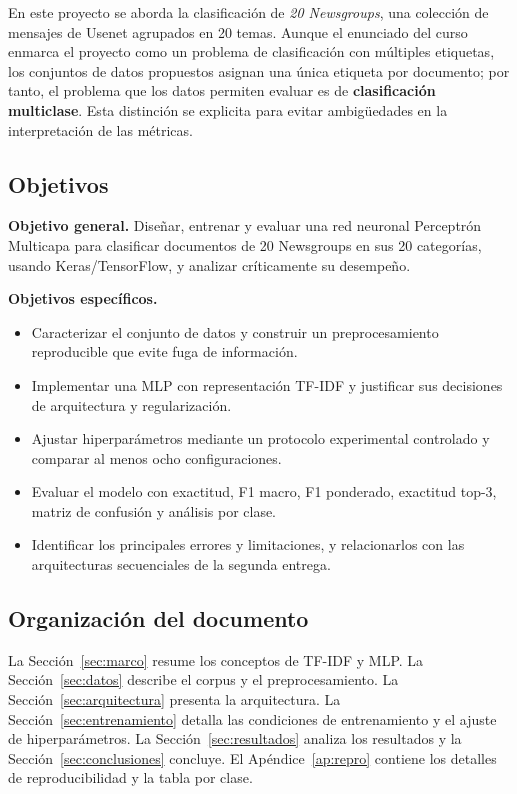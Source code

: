 \documentclass[11pt,letterpaper]{article}
\begin{document}
En este proyecto se aborda la clasificación de \textit{20 Newsgroups}, una colección de mensajes de Usenet agrupados en 20 temas. Aunque el enunciado del curso enmarca el proyecto como un problema de clasificación con múltiples etiquetas, los conjuntos de datos propuestos asignan una única etiqueta por documento; por tanto, el problema que los datos permiten evaluar es de \textbf{clasificación multiclase}. Esta distinción se explicita para evitar ambigüedades en la interpretación de las métricas.

\subsection*{Objetivos}

\textbf{Objetivo general.} Diseñar, entrenar y evaluar una red neuronal Perceptrón Multicapa para clasificar documentos de 20 Newsgroups en sus 20 categorías, usando Keras/TensorFlow, y analizar críticamente su desempeño.

\textbf{Objetivos específicos.}
\begin{itemize}[leftmargin=1.2em]
  \item Caracterizar el conjunto de datos y construir un preprocesamiento reproducible que evite fuga de información.
  \item Implementar una MLP con representación TF-IDF y justificar sus decisiones de arquitectura y regularización.
  \item Ajustar hiperparámetros mediante un protocolo experimental controlado y comparar al menos ocho configuraciones.
  \item Evaluar el modelo con exactitud, F1 macro, F1 ponderado, exactitud top-3, matriz de confusión y análisis por clase.
  \item Identificar los principales errores y limitaciones, y relacionarlos con las arquitecturas secuenciales de la segunda entrega.
\end{itemize}

\subsection*{Organización del documento}

La Sección~\ref{sec:marco} resume los conceptos de TF-IDF y MLP. La Sección~\ref{sec:datos} describe el corpus y el preprocesamiento. La Sección~\ref{sec:arquitectura} presenta la arquitectura. La Sección~\ref{sec:entrenamiento} detalla las condiciones de entrenamiento y el ajuste de hiperparámetros. La Sección~\ref{sec:resultados} analiza los resultados y la Sección~\ref{sec:conclusiones} concluye. El Apéndice~\ref{ap:repro} contiene los detalles de reproducibilidad y la tabla por clase.
\end{document}
